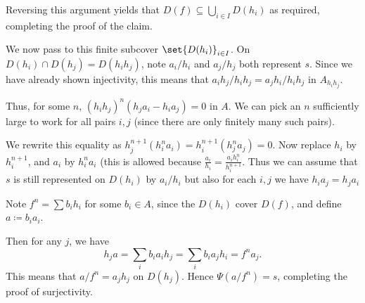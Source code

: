 Reversing this argument yields that $D(f) \subseteq \bigcup_{i \in I} D(h_i)$ as
required, completing the proof of the claim.

We now pass to this finite subcover $\set{D(h_i)}_{i \in I}$. On
$D(h_i)\cap D(h_j) = D(h_ih_j)$, note $a_i/h_i$ and $a_j/h_j$ both represent $s$. Since we
have already shown injectivity, this means that $a_ih_j/h_ih_j = a_jh_i/h_ih_j$ in $A_{h_ih_j}$.

Thus, for some $n$, $(h_ih_j)^n(h_ja_i - h_ia_j) = 0$ in $A$. We can pick an $n$
sufficiently large to work for all pairs $i, j$ (since there are only finitely many
such pairs).

We rewrite this equality as $h_j^{n+1}(h_i^na_i) = h_i^{n+1}(h_j^na_j) = 0$.
Now replace $h_i$ by $h_i^{n+1}$, and $a_i$ by $h_i^na_i$ (this is allowed because
$\frac{a_i}{h_i}= \frac{a_ih_i^n}{h_i^{n+1}}$. Thus we can assume that $s$ is still
represented on $D(h_i)$ by $a_i/h_i$ but also for each $i, j$ we have $h_ia_j = h_ja_i$

Note $f^n = \sum b_ih_i$ for some $b_i \in A$, since the $D(h_i)$ cover $D(f)$,
and define $a \coloneqq b_ia_i$.

Then for any $j$, we have \[ h_ja = \sum_i b_ia_ih_j = \sum_i b_ia_jh_i = f^na_j. \]
This means that $a/f^n = a_jh_j$ on $D(h_j)$. Hence $\Psi(a/f^n) = s$, completing
the proof of surjectivity.
